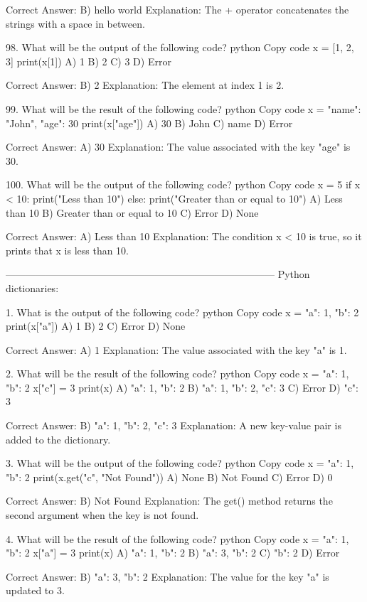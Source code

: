 Correct Answer: B) hello world
Explanation: The + operator concatenates the strings with a space in between.

98. What will be the output of the following code?
python
Copy code
x = [1, 2, 3]
print(x[1])
A) 1
B) 2
C) 3
D) Error

Correct Answer: B) 2
Explanation: The element at index 1 is 2.

99. What will be the result of the following code?
python
Copy code
x = {"name": "John", "age": 30}
print(x["age"])
A) 30
B) John
C) name
D) Error

Correct Answer: A) 30
Explanation: The value associated with the key "age" is 30.

100. What will be the output of the following code?
python
Copy code
x = 5
if x < 10:
    print("Less than 10")
else:
    print("Greater than or equal to 10")
A) Less than 10
B) Greater than or equal to 10
C) Error
D) None

Correct Answer: A) Less than 10
Explanation: The condition x < 10 is true, so it prints that x is less than 10.

---------------------------------------------------------------------------------
Python dictionaries:

1. What is the output of the following code?
python
Copy code
x = {"a": 1, "b": 2}
print(x["a"])
A) 1
B) 2
C) Error
D) None

Correct Answer: A) 1
Explanation: The value associated with the key "a" is 1.

2. What will be the result of the following code?
python
Copy code
x = {"a": 1, "b": 2}
x["c"] = 3
print(x)
A) {"a": 1, "b": 2}
B) {"a": 1, "b": 2, "c": 3}
C) Error
D) {"c": 3}

Correct Answer: B) {"a": 1, "b": 2, "c": 3}
Explanation: A new key-value pair is added to the dictionary.

3. What will be the output of the following code?
python
Copy code
x = {"a": 1, "b": 2}
print(x.get("c", "Not Found"))
A) None
B) Not Found
C) Error
D) 0

Correct Answer: B) Not Found
Explanation: The get() method returns the second argument when the key is not found.

4. What will be the result of the following code?
python
Copy code
x = {"a": 1, "b": 2}
x["a"] = 3
print(x)
A) {"a": 1, "b": 2}
B) {"a": 3, "b": 2}
C) {"b": 2}
D) Error

Correct Answer: B) {"a": 3, "b": 2}
Explanation: The value for the key "a" is updated to 3.


